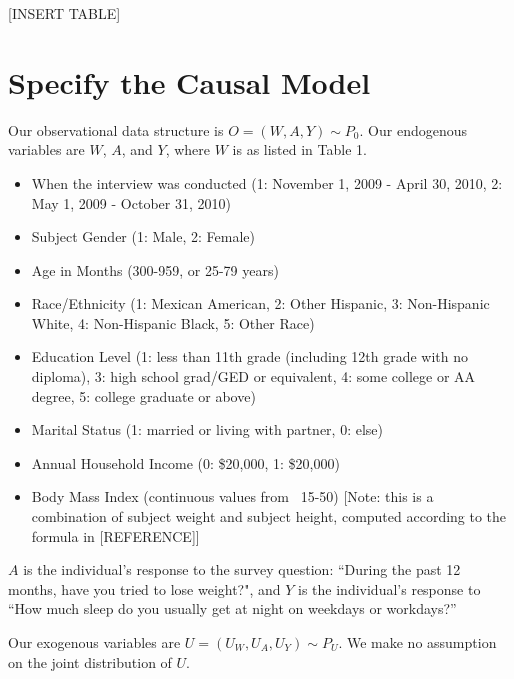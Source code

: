 \documentclass{article}
\begin{document}
[INSERT TABLE]

% 
% 

\section{Specify the Causal Model}

Our observational data structure is $O=(W,A,Y) \sim P_0$. Our endogenous variables are $W$, $A$, and $Y$, where $W$ is as listed in Table 1.

\begin{itemize}
\item When the interview was conducted (1: November 1, 2009 - April 30, 2010, 2: May 1, 2009 - October 31, 2010)
\item Subject Gender (1: Male, 2: Female)
\item Age in Months (300-959, or 25-79 years)
\item Race/Ethnicity (1: Mexican American, 2: Other Hispanic, 3: Non-Hispanic White, 4: Non-Hispanic Black, 5: Other Race)
\item Education Level (1: less than 11th grade (including 12th grade with no diploma), 3: high school grad/GED or equivalent, 4: some college or AA degree, 5: college graduate or above)
\item Marital Status (1: married or living with partner, 0: else)
\item Annual Household Income (0: \$20,000, 1: \$20,000)
\item Body Mass Index (continuous values from ~15-50) [Note: this is a combination of subject weight and subject height, computed according to the formula in [REFERENCE]]
\end{itemize}

$A$ is the individual's response to the survey question: ``During the past 12 months, have you tried to lose weight?", and $Y$ is the individual's response to ``How much sleep do you usually get at night on weekdays or workdays?''  

Our exogenous variables are $U = (U_W, U_A, U_Y) \sim P_U$. We make no assumption on the joint distribution of $U$.  
\end{document}
